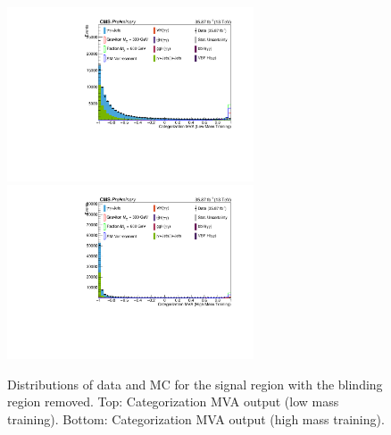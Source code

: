\begin{figure}[thb]
  \centering
\includegraphics[width=0.65\textwidth]{figures/sec-control/NP_HHTagger_LM}
\includegraphics[width=0.65\textwidth]{figures/sec-control/NP_HHTagger_HM}
  \caption{Distributions of data and MC for the signal region with the blinding region removed. Top: Categorization MVA output (low mass training). Bottom: Categorization MVA output (high mass training).}
\label{fig:cp_mgg8}
\end{figure}

